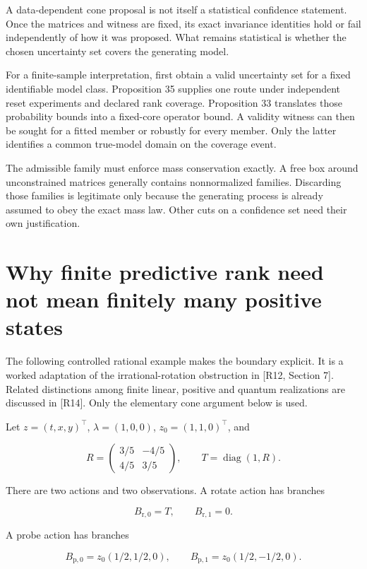 A data-dependent cone proposal is not itself a statistical confidence
statement. Once the matrices and witness are fixed, its exact invariance
identities hold or fail independently of how it was proposed. What
remains statistical is whether the chosen uncertainty set covers the
generating model.

For a finite-sample interpretation, first obtain a valid uncertainty set
for a fixed identifiable model class. Proposition 35 supplies one route
under independent reset experiments and declared rank coverage.
Proposition 33 translates those probability bounds into a fixed-core
operator bound. A validity witness can then be sought for a fitted
member or robustly for every member. Only the latter identifies a common
true-model domain on the coverage event.

The admissible family must enforce mass conservation exactly. A free box
around unconstrained matrices generally contains nonnormalized families.
Discarding those families is legitimate only because the generating
process is already assumed to obey the exact mass law. Other cuts on a
confidence set need their own justification.

\section{Why finite predictive rank need not mean finitely many positive states}\label{LSM:why-finite-predictive-rank-need-not-mean-finitely-many-positive-states}

The following controlled rational example makes the boundary explicit.
It is a worked adaptation of the irrational-rotation obstruction in
{[}R12, Section 7{]}. Related distinctions among finite linear, positive
and quantum realizations are discussed in {[}R14{]}. Only the elementary
cone argument below is used.

Let \(z=(t,x,y)^\top\), \(\lambda=(1,0,0)\), \(z_0=(1,1,0)^\top\), and

\[
R=\begin{pmatrix}3/5&-4/5\\4/5&3/5\end{pmatrix},
\qquad T=\operatorname{diag}(1,R).
\]

There are two actions and two observations. A rotate action has branches

\[
B_{\mathrm r,0}=T,\qquad B_{\mathrm r,1}=0.
\]

A probe action has branches

\[
B_{\mathrm p,0}=z_0(1/2,1/2,0),\qquad
B_{\mathrm p,1}=z_0(1/2,-1/2,0).
\]

